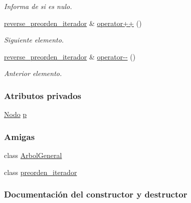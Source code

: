 \begin{DoxyCompactItemize}
\begin{DoxyCompactList}\small\item\em Informa de si es nulo. \end{DoxyCompactList}\item 
\hyperlink{classArbolGeneral_1_1reverse__preorden__iterador}{reverse\+\_\+preorden\+\_\+iterador} \& \hyperlink{classArbolGeneral_1_1reverse__preorden__iterador_a46a546c134ae2d7fe7bc41e16227eb1f}{operator++} ()
\begin{DoxyCompactList}\small\item\em Siguiente elemento. \end{DoxyCompactList}\item 
\hyperlink{classArbolGeneral_1_1reverse__preorden__iterador}{reverse\+\_\+preorden\+\_\+iterador} \& \hyperlink{classArbolGeneral_1_1reverse__preorden__iterador_abe501ae99cd71b927e21f882ec4bfec6}{operator-\/-\/} ()
\begin{DoxyCompactList}\small\item\em Anterior elemento. \end{DoxyCompactList}\end{DoxyCompactItemize}
\subsubsection*{Atributos privados}
\begin{DoxyCompactItemize}
\item 
\hyperlink{classArbolGeneral_a12cc1b74a9095d89bc7334290d332f7a}{Nodo} \hyperlink{classArbolGeneral_1_1reverse__preorden__iterador_a002862fdee453a84b037e5dd26c071a2}{p}
\end{DoxyCompactItemize}
\subsubsection*{Amigas}
\begin{DoxyCompactItemize}
\item 
class \hyperlink{classArbolGeneral_1_1reverse__preorden__iterador_a9c06e31b7c3e0d4ee5b03003d32935a5}{Arbol\+General}
\item 
class \hyperlink{classArbolGeneral_1_1reverse__preorden__iterador_a4aa0da8bfbc320a8daff98451ee65b6c}{preorden\+\_\+iterador}
\end{DoxyCompactItemize}


\subsubsection{Documentación del constructor y destructor}

